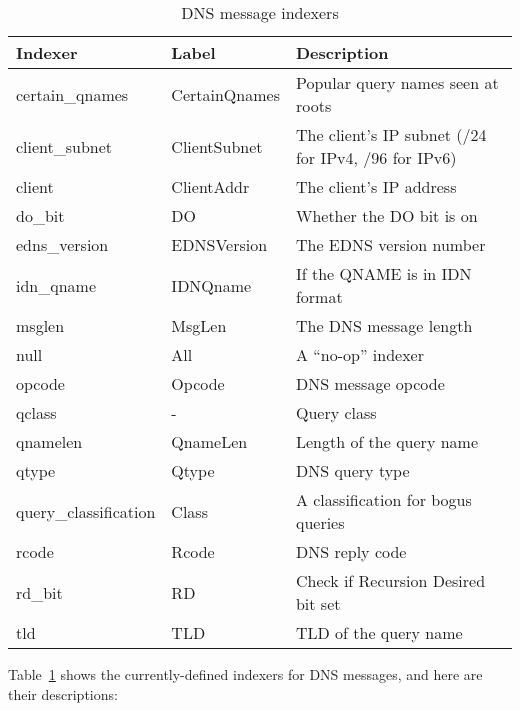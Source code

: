 \documentclass{report}
\begin{document}
\begin{table}
\begin{center}
\begin{tabular}{|lll|}
\hline
Indexer & Label & Description \\
\hline 
certain\_qnames & CertainQnames & Popular query names seen at roots \\
client\_subnet & ClientSubnet & The client's IP subnet (/24 for IPv4, /96 for IPv6) \\
client & ClientAddr & The client's IP address \\
do\_bit & DO & Whether the DO bit is on \\
edns\_version & EDNSVersion & The EDNS version number \\
idn\_qname & IDNQname & If the QNAME is in IDN format \\
msglen & MsgLen & The DNS message length \\
null & All & A ``no-op'' indexer \\
opcode & Opcode & DNS message opcode \\
qclass & - & Query class \\
qnamelen & QnameLen & Length of the query name \\
qtype & Qtype & DNS query type \\
query\_classification & Class & A classification for bogus queries \\
rcode & Rcode & DNS reply code \\
rd\_bit & RD & Check if Recursion Desired bit set \\
tld & TLD & TLD of the query name \\
\hline
\end{tabular}
\caption{\label{tbl-dns-indexers}DNS message indexers}
\end{center}
\end{table}

Table~\ref{tbl-dns-indexers} shows the currently-defined indexers
for DNS messages, and here are their descriptions:
\end{document}
